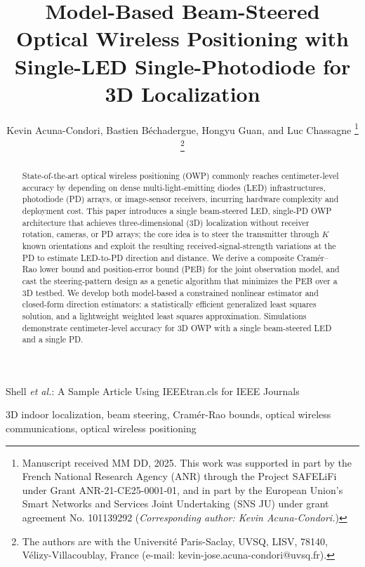 \documentclass[journal]{IEEEtran}
\begin{document}

\title{Model-Based Beam-Steered Optical Wireless Positioning with Single-LED Single-Photodiode for 3D Localization}
\author{Kevin Acuna-Condori, Bastien Béchadergue, Hongyu Guan, and Luc Chassagne
\thanks{Manuscript received MM DD, 2025.
This work was supported in part by the French National Research Agency (ANR) through the Project SAFELiFi under Grant ANR-21-CE25-0001-01, and in part by the European Union's Smart Networks and Services Joint Undertaking (SNS JU) under grant agreement No. 101139292 (\textit{Corresponding author: Kevin Acuna-Condori.})
}
\thanks{
The authors are with the Université Paris-Saclay, UVSQ, LISV, 78140, Vélizy-Villacoublay, France (e-mail: kevin-jose.acuna-condori@uvsq.fr).
}
}
%
{Shell \MakeLowercase{\textit{et al.}}: A Sample Article Using IEEEtran.cls for IEEE Journals}
\maketitle

\begin{abstract}
State-of-the-art optical wireless positioning (OWP) commonly reaches centimeter-level accuracy by depending on dense multi-light-emitting diodes (LED) infrastructures, photodiode (PD) arrays, or image-sensor receivers, incurring hardware complexity and deployment cost. 
This paper introduces a single beam-steered LED, single-PD OWP architecture that achieves three-dimensional (3D) localization without receiver rotation, cameras, or PD arrays; the core idea is to steer the transmitter through $K$ known orientations and exploit the resulting received-signal-strength variations at the PD to estimate LED-to-PD direction and distance. We derive a composite Cramér–Rao lower bound and position-error bound (PEB) for the joint observation model, and cast the steering-pattern design as a genetic algorithm that minimizes the PEB over a 3D testbed. We develop both model-based a constrained nonlinear estimator and closed-form direction estimators: a statistically efficient generalized least squares solution, and a lightweight weighted least squares approximation. 
Simulations demonstrate centimeter-level accuracy for 3D OWP with a single beam-steered LED and a single PD.
\end{abstract}

\begin{IEEEkeywords} 
    3D indoor localization, beam steering, Cramér-Rao bounds, optical wireless communications, optical wireless positioning
\end{IEEEkeywords}
\end{document}
